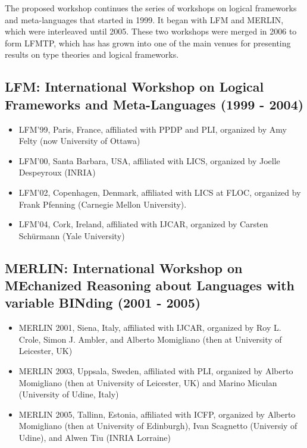 \documentclass{article}
\begin{document}
  The proposed workshop continues the series of workshops on logical
  frameworks and meta-languages that started in 1999. It began with
  LFM and MERLIN, which were interleaved until 2005. These two
  workshops were merged in 2006 to form LFMTP, which has has grown
  into one of the main venues for presenting results on type theories
  and logical frameworks.
  
\subsection{LFM: International Workshop on Logical Frameworks and Meta-Languages (1999 - 2004)}

\begin{itemize}
\item LFM'99, Paris, France, affiliated with PPDP and PLI, organized by
     Amy Felty (now University of Ottawa)

\item LFM'00, Santa Barbara, USA, affiliated with LICS, organized by
     Joelle Despeyroux (INRIA)

\item LFM'02, Copenhagen, Denmark, affiliated with LICS at FLOC,
     organized by Frank Pfenning (Carnegie Mellon University).

\item LFM'04, Cork, Ireland, affiliated with IJCAR, organized by
     Carsten Schürmann (Yale University)
\end{itemize}
   
\subsection{MERLIN: International Workshop on MEchanized Reasoning about
Languages with variable BINding (2001 - 2005)}

\begin{itemize}
\item MERLIN 2001, Siena, Italy, affiliated with IJCAR, organized by
     Roy L. Crole, Simon J. Ambler, and Alberto Momigliano (then at
     University of Leicester, UK)

\item MERLIN 2003, Uppsala, Sweden, affiliated with PLI, organized by
     Alberto Momigliano (then at University of Leicester, UK) and
     Marino Miculan (University of Udine, Italy)

\item MERLIN 2005, Tallinn, Estonia, affiliated with ICFP, organized by
     Alberto Momigliano (then at University of Edinburgh), Ivan
     Scagnetto (Universiy of Udine), and Alwen Tiu (INRIA Lorraine)
\end{itemize}
   
\end{document}
